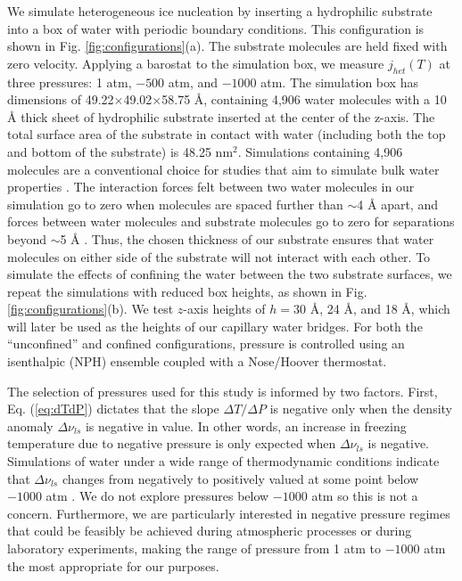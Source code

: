 \documentclass[journal abbreviation, manuscript]{copernicus}
\begin{document}
We simulate heterogeneous ice nucleation by inserting a hydrophilic substrate into a box of water with periodic boundary conditions. This configuration is shown in Fig. \ref{fig:configurations}(a). The substrate molecules are held fixed with zero velocity. Applying a barostat to the simulation box, we measure $j_{het}(T)$ at three pressures: 1 atm, $-500$ atm, and $-1000$ atm. The simulation box has dimensions of 49.22$\times$49.02$\times$58.75 \AA{}, containing 4,906 water molecules with a 10 \AA{} thick sheet of hydrophilic substrate inserted at the center of the z-axis. The total surface area of the substrate in contact with water (including both the top and bottom of the substrate) is 48.25 nm$^2$. Simulations containing 4,906 molecules are a conventional choice for studies that aim to simulate bulk water properties \citep{molinero2009, lupi2014, li2011}. The interaction forces felt between two water molecules in our simulation go to zero when molecules are spaced further than $\sim$4 \AA{} apart, and forces between water molecules and substrate molecules go to zero for separations beyond $\sim$5 \AA{} \citep{molinero2009}. Thus, the chosen thickness of our substrate ensures that water molecules on either side of the substrate will not interact with each other. To simulate the effects of confining the water between the two substrate surfaces, we repeat the simulations with reduced box heights, as shown in Fig. \ref{fig:configurations}(b). We test $z$-axis heights of $h = 30$ \AA{}, 24 \AA{}, and 18 \AA{}, which will later be used as the heights of our capillary water bridges. For both the ``unconfined'' and confined configurations, pressure is controlled using an isenthalpic (NPH) ensemble coupled with a Nose/Hoover thermostat. 

The selection of pressures used for this study is informed by two factors. First, Eq. (\ref{eq:dTdP}) dictates that the slope $\Delta T/ \Delta P$ is negative only when the density anomaly $\Delta \nu_{ls}$ is negative in value. In other words, an increase in freezing temperature due to negative pressure is only expected when $\Delta \nu_{ls}$ is negative. Simulations of water under a wide range of thermodynamic conditions indicate that $\Delta \nu_{ls}$ changes from negatively to positively valued at some point below $-1000$ atm \citep{bianco2021}. We do not explore pressures below $-1000$ atm so this is not a concern. Furthermore, we are particularly interested in negative pressure regimes that could be feasibly be achieved during atmospheric processes or during laboratory experiments, making the range of pressure from 1 atm to $-1000$ atm the most appropriate for our purposes.
\end{document}
